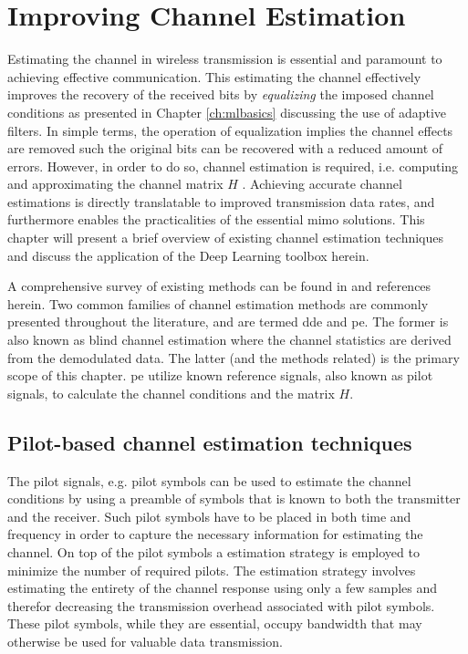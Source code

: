 \chapter{Improving Channel Estimation}\label{ch:channel_estimation}

Estimating the channel in wireless transmission is essential and paramount to achieving effective communication. This estimating the channel effectively improves the recovery of the received bits by \emph{equalizing} the imposed channel conditions as presented in Chapter \ref{ch:mlbasics} discussing the use of adaptive filters. In simple terms, the operation of equalization implies the channel effects are removed such the original bits can be recovered with a reduced amount of errors. However, in order to do so, channel estimation is required, i.e. computing and approximating the channel matrix $H$ \cite{Cho2010MIMO-OFDMMATLAB}. Achieving accurate channel estimations is directly translatable to improved transmission data rates, and furthermore enables the practicalities of the essential \gls{mimo} solutions. This chapter will present a brief overview of existing channel estimation techniques and discuss the application of the Deep Learning toolbox herein. 

A comprehensive survey of existing methods can be found in  \cite{Cho2010MIMO-OFDMMATLAB, Liu2014ChannelOFDM} and references herein. Two common families of channel estimation methods are commonly presented throughout the literature, and are termed \gls{dde} and \gls{pe}. The former is also known as blind channel estimation where the channel statistics are derived from the demodulated data. The latter (and the methods related) is the primary scope of this chapter. \gls{pe} utilize known reference signals, also known as pilot signals, to calculate the channel conditions and the matrix $H$.


\section{Pilot-based channel estimation techniques}\label{sec:channel_estimators}
The pilot signals, e.g. pilot symbols can be used to estimate the channel conditions by using a preamble of symbols that is known to both the transmitter and the receiver. Such pilot symbols have to be placed in both time and frequency in order to capture the necessary information for estimating the channel. On top of the pilot symbols a estimation strategy is employed to minimize the number of required pilots. The estimation strategy involves estimating the entirety of the channel response using only a few samples and therefor decreasing the transmission overhead associated with pilot symbols. These pilot symbols, while they are essential, occupy bandwidth that may otherwise be used for valuable data transmission.

